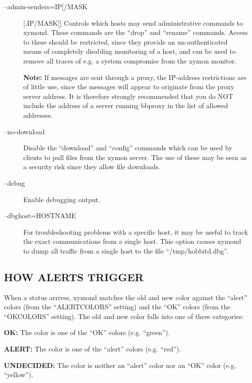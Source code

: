 \begin{description}
 

\item[--admin-senders=IP[/MASK][,IP/MASK]] Controls which hosts may send administrative commands to xymond. These commands are the ``drop'' and ``rename'' commands. Access to these should be restricted, since they provide an un-authenticated means of completely disabling monitoring of a host, and can be used to remove all traces of e.g. a system compromise from the xymon monitor. 

 \textbf{Note:}
 If messages are sent through a proxy, the IP-address restrictions are of little use, since the messages will appear to originate from the proxy server address. It is therefore strongly recommended that you do NOT include the address of a server running bbproxy in the list of allowed addresses. 


 

\item[--no-download] Disable the ``download'' and ``config'' commands which can be used by clients to pull files from the xymon server. The use of these may be seen as a security risk since they allow file downloads. 

 

\item[--debug] Enable debugging output. 

 

\item[--dbghost=HOSTNAME] For troubleshooting problems with a specific host, it may be useful to track the exact communications from a single host. This option causes xymond to dump all traffic from a single host to the file ``/tmp/hobbitd.dbg''. 

 


\end{description}
\subsection{HOW ALERTS TRIGGER}
 When a status arrives, xymond matches the old and new color against the ``alert'' colors (from the ``ALERTCOLORS'' setting) and the ``OK'' colors (from the ``OKCOLORS'' setting). The old and new color falls into one of three categories: 

 \textbf{OK:}
 The color is one of the ``OK'' colors (e.g. ``green''). 


 \textbf{ALERT:}
 The color is one of the ``alert'' colors (e.g. ``red''). 


 \textbf{UNDECIDED:}
 The color is neither an ``alert'' color nor an ``OK'' color (e.g. ``yellow''). 


